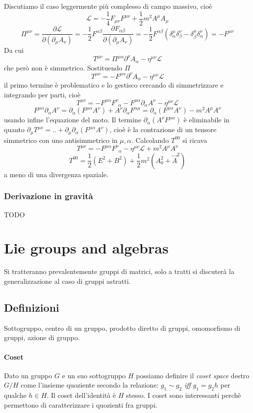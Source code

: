 \documentclass[12pt,oneside,notitlepage,abstracton,a4paper]{scrartcl}
\renewcommand{\L}{\mathcal{L}}
\begin{document}
Discutiamo il caso leggermente più complesso di campo massivo, cioè
\[ \L = -\dfrac{1}{4} F_{\mu\nu} F^{\mu\nu} + \dfrac{1}{2} m^2 A^\mu A_\mu \]
\[ \Pi^{\mu\nu} = \dfrac{\partial \L}{\partial(\partial_\mu A_\nu)} = -\dfrac{1}{2} F^{\alpha\beta} \dfrac{\partial F_{\alpha\beta}}{\partial(\partial_\mu A_\nu)} = -\dfrac{1}{2} F^{\alpha\beta} (\delta^\mu_\alpha\delta^\nu_\beta - \delta^\mu_\beta\delta^\nu_\alpha) = - F^{\mu\nu} \]
Da cui
\[ T^{\mu\nu} = \Pi^{\mu\alpha}\partial^\nu A_\alpha - \eta^{\mu\nu} \L \]
che però non è simmetrico. Sostituendo $\Pi$
\[ T^{\mu\nu} = -F^{\mu\alpha}\partial^\nu A_\alpha - \eta^{\mu\nu} \L \]
il primo termine è problematico e lo gestisco cercando di simmetrizzare e integrando per parti, cioè
\[ T^{\mu\nu} = -F^{\mu\alpha}F^\nu_{\enspace\alpha} - F^{\mu\alpha}\partial_\alpha A^\nu -\eta^{\mu\nu} \L \]
\[ F^{\mu\alpha}\partial_\alpha A^\nu = \partial_\alpha(F^{\mu\alpha} A^\nu) + A^\nu \partial_\alpha F^{\alpha \mu} = \partial_\alpha(F^{\mu\alpha} A^\nu) - m^2 A^\mu A^\nu \]
usando infine l'equazione del moto. Il termine $\partial_\alpha(A^\nu F^{\mu\alpha})$ è eliminabile in quanto $\partial_\mu T^{\mu\nu} = .. + \partial_\mu\partial_\alpha(F^{\mu\alpha}A^\nu)$, cioè è la contrazione di un tensore simmetrico con uno antisimmetrico in $\mu,\alpha$. Calcolando $T^{00}$ si ricava
\[ T^{\mu\nu} = -F^{\mu\alpha} F^\nu_{\enspace\alpha} - \eta^{\mu\nu} \L + m^2 A^\mu A^\nu \]
\[ T^{00} = \dfrac{1}{2}(E^2+B^2) + \dfrac{1}{2} m^2 (A_0^2 + \vec{A}^2) \]
a meno di una divergenza spaziale.

\subsubsection{Derivazione in gravità}
TODO

\section{Lie groups and algebras}
Si tratteranno prevalentemente gruppi di matrici, solo a tratti si discuterà la generalizzazione al caso di gruppi astratti.
\subsection{Definizioni}
Sottogruppo, centro di un gruppo, prodotto diretto di gruppi, omomorfismo di gruppi, azione di gruppo.
\paragraph{Coset} Dato un gruppo $G$ e un suo sottogruppo $H$ possiamo definire il \emph{coset space} destro $G/H$ come l'insieme quoziente secondo la relazione: $g_1 \sim g_2$ \emph{iff} $g_1 = g_2 h$ per qualche $h\in H$. Il coset dell'identità è $H$ stesso. I coset sono interessanti perchè permettono di caratterizzare i quozienti fra gruppi.
\end{document}
